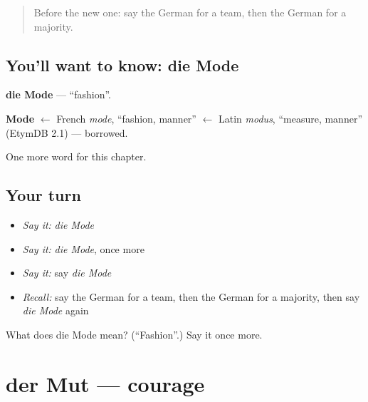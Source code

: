 \label{lesson:GE-C234-mode}



\begin{quote}
Before the new one: say the German for a team, then the German for a majority.
\end{quote}

\subsection*{You'll want to know: die Mode}
\textbf{die Mode} — \textquotedblleft{}fashion\textquotedblright{}.

\begin{cousinweb}
\textbf{Mode} $\leftarrow$ French \emph{mode}, \textquotedblleft{}fashion, manner\textquotedblright{} $\leftarrow$ Latin \emph{modus}, \textquotedblleft{}measure, manner\textquotedblright{} (EtymDB 2.1) — borrowed.
\end{cousinweb}

\begin{grammarlens}[title={What you've built}]
One more word for this chapter.
\end{grammarlens}

\subsection*{Your turn}
\begin{itemize}
\raggedright
  \item \emph{Say it:} \emph{die Mode}
  \item \emph{Say it:} \emph{die Mode}, once more
  \item \emph{Say it:} say \emph{die Mode}
  \item \emph{Recall:} say the German for a team, then the German for a majority, then say \emph{die Mode} again
\end{itemize}

\begin{tcolorbox}[breakable,colback=teal!4,colframe=teal!35!black,title={Before you move on}]
What does die Mode mean? (\textquotedblleft{}Fashion\textquotedblright{}.) Say it once more.
\end{tcolorbox}
\section[der Mut]{der Mut — courage}

\label{lesson:GE-C234-mut}



